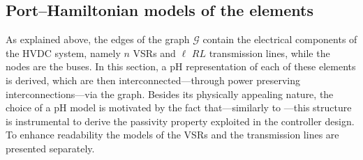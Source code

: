 \documentclass[5p,twocolumn]{elsarticle}
\numberwithin{equation}{section}
\begin{document}
\subsection{Port--Hamiltonian models of the elements}
As explained above, the edges of the graph $\mathcal{G}$ contain the electrical components of the HVDC system, namely $n$ VSRs and $\ell$ $RL$ transmission lines, while the nodes are the buses. In this section,
a pH representation of each of these elements is derived, which are then interconnected---through power preserving interconnections---via the graph. Besides its physically appealing nature, the choice of a pH model is
motivated by the fact that---similarly to \cite{HERetal}---this structure is instrumental to derive the passivity property exploited in the controller design. To enhance readability the models of the VSRs and
the transmission lines are presented separately.
\end{document}
